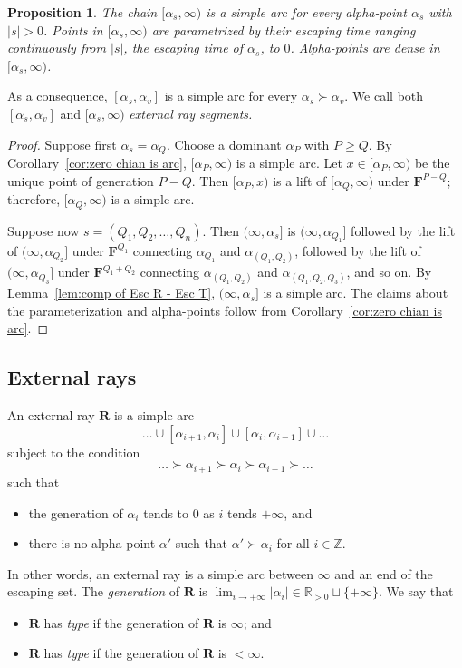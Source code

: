 \documentclass{amsart}
\newcommand{\1}{{\mathbb 1 }}
\newcommand\binfty{{\infty}}%
\newcommand{\bF}{{\mathbf F}}
\newcommand{\bR}{{\mathbf R}}
\newcommand{\R}{\mathbb{R}}
\newcommand{\Z}{\mathbb{Z}}
\newtheorem{prop}[thm]{Proposition}
\theoremstyle{remark}
\numberwithin{equation}{section}
\theoremstyle{definition}
\newcommand{\RN}[1]{\MakeUppercase{\romannumeral#1}}%
\theoremstyle{nonumberbreak}
\begin{document}
\begin{prop}
\label{prop:alpha v alpha s is arc}
  The chain $[\alpha_{s},\binfty)$ is a simple arc for every alpha-point $\alpha_s$ with $|s|>0$. Points in $[\alpha_{s},\binfty)$ are parametrized by their escaping time ranging continuously from $|s|$, the escaping time of $\alpha_s$, to $0$. Alpha-points are dense in $[\alpha_{s},\binfty)$.
\end{prop}
\noindent As a consequence, $[\alpha_{s},\alpha_v]$ is a simple arc for every $\alpha_s \succ\alpha_v$. We call both $[\alpha_{s},\alpha_v]$ and $[\alpha_s,\binfty)$ \emph{external ray segments.}
\begin{proof}
Suppose first $\alpha_s=\alpha_Q$. Choose a dominant $\alpha_P$ with $P\ge Q$. By Corollary~\ref{cor:zero chian is arc}, $[\alpha_P,\binfty)$ is a simple arc. Let $x\in [\alpha_P,\binfty)$ be the unique point of generation $P-Q$. Then $[\alpha_P,x)$ is a lift of $[\alpha_Q,\binfty)$ under $\bF^{P-Q}$; therefore, $[\alpha_Q,\binfty)$ is a simple arc.

Suppose now $s=(Q_1,Q_2,\dots, Q_n)$. Then $(\binfty,\alpha_s]$ is $(\binfty,\alpha_{Q_1}]$ followed by the lift of $(\binfty,\alpha_{Q_2}]$ under $\bF^{Q_1}$ connecting $\alpha_{Q_1}$ and $\alpha_{(Q_1,Q_2)}$, followed by the lift of $(\binfty,\alpha_{Q_3}]$ under $\bF^{Q_1+Q_2}$ connecting $\alpha_{(Q_1,Q_2)}$ and $\alpha_{(Q_1,Q_2, Q_3)}$, and so on. By Lemma~\ref{lem:comp of Esc R - Esc T}, $(\binfty,\alpha_s]$ is a simple arc. The claims about the parameterization and alpha-points follow from Corollary~\ref{cor:zero chian is arc}. 
 \end{proof}

\subsection{External rays}
\label{ss:ExtRayFstr}
 An external ray $\bR$ is a simple arc
\[\dots \cup [\alpha_{i+1},\alpha_i]\cup [\alpha_{i},\alpha_{i-1}]\cup \dots\] 
subject to the condition \[\dots \succ\alpha_{i+1}\succ\alpha_i\succ\alpha_{i-1}\succ\dots\] such that
\begin{itemize}
\item the generation of $\alpha_i$ tends to $0$ as $i$ tends $+\infty$, and
\item there is no alpha-point $\alpha'$ such that $\alpha'\succ \alpha_i$ for all $i\in \Z$.
\end{itemize}
In other words, an external ray is a simple arc between $\infty$ and an end of the escaping set. The \emph{generation} of $\bR$ is $\lim_{i\to +\infty } |\alpha_i|\in \R_{>0}\sqcup \{+\infty \}$. We say that
\begin{itemize}
\item $\bR$ has \emph{type \RN{1}} if the generation of $\bR$ is $\infty$; and
\item $\bR$ has \emph{type \RN{2}} if the generation of $\bR$ is $<\infty$.
\end{itemize}
\end{document}
